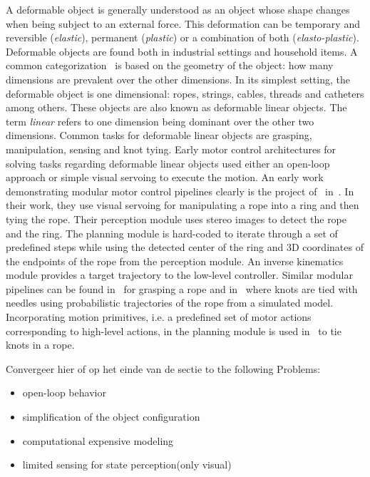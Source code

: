 \documentclass[\home/main.tex]{subfiles}
\begin{document}
A deformable object is generally understood as an object whose shape changes when being subject to an external force. This deformation can be temporary and reversible (\textit{elastic}), permanent (\textit{plastic}) or a combination of both (\textit{elasto-plastic}). Deformable objects are found both in industrial settings and household items. A common categorization~\autocite{Saadat2002,Jimenez2012} is based on the geometry of the object: how many dimensions are prevalent over the other dimensions. In its simplest setting, the deformable object is one dimensional: ropes, strings, cables, threads and catheters among others. These objects are also known as deformable linear objects. The term \textit{linear} refers to one dimension being dominant over the other two dimensions. Common tasks for deformable linear objects are grasping, manipulation, sensing and knot tying. Early motor control architectures for solving tasks regarding deformable linear objects used either an open-loop approach or simple visual servoing to execute the motion. An early work demonstrating modular motor control pipelines clearly is the project of~\citeauthor{Inaba1987} in~\citeyear{Inaba1987}. In their work, they use visual servoing for manipulating a rope into a ring and then tying the rope. Their perception module uses stereo images to detect the rope and the ring. The planning module is hard-coded to iterate through a set of predefined steps while using the detected center of the ring and 3D coordinates of the endpoints of the rope from the perception module. An inverse kinematics module provides a target trajectory to the low-level controller. Similar modular pipelines can be found in~\autocite{Remde1999} for grasping a rope and in~\autocite{Saha2007} where knots are tied with needles using probabilistic trajectories of the rope from a simulated model. Incorporating motion primitives, i.e. a predefined set of motor actions corresponding to high-level actions, in the planning module is used in~\autocite{Yamakawa2008, Vinh2012} to tie knots in a rope.

Convergeer hier of op het einde van de sectie to the following Problems:
\begin{itemize}
    \item  open-loop behavior
    \item  simplification of the object configuration
    \item  computational expensive modeling
    \item  limited sensing for state perception(only visual)
\end{itemize}
\end{document}
